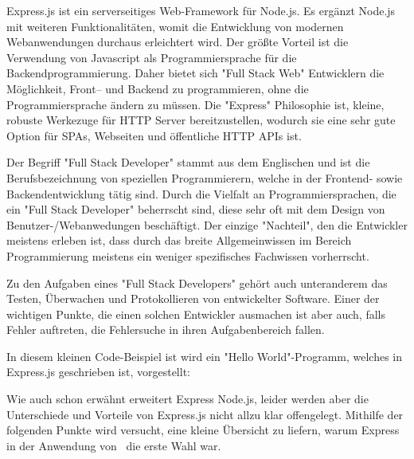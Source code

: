 
Express.js ist ein serverseitiges Web-Framework für Node.js. Es ergänzt Node.js mit weiteren Funktionalitäten, womit die Entwicklung von modernen Webanwendungen durchaus erleichtert wird. Der größte Vorteil ist die Verwendung von Javascript als Programmiersprache für die Backendprogrammierung. Daher bietet sich "Full Stack Web" Entwicklern die Möglichkeit, Front– und Backend zu programmieren, ohne die Programmiersprache ändern zu müssen. Die "Express" Philosophie ist, kleine, robuste Werkezuge für HTTP Server bereitzustellen, wodurch sie eine sehr gute Option für SPAs, Webseiten und öffentliche HTTP APIs ist. \cite{Express}

Der Begriff "Full Stack Developer" stammt aus dem Englischen und ist die Berufsbezeichnung von speziellen Programmierern, welche in der Frontend- sowie Backendentwicklung tätig sind. Durch die Vielfalt an Programmiersprachen, die ein "Full Stack Developer" beherrscht sind, diese sehr oft mit dem Design von Benutzer-/Webanwedungen beschäftigt. Der einzige "Nachteil", den die Entwickler meistens erleben ist, dass durch das breite Allgemeinwissen im Bereich Programmierung meistens ein weniger spezifisches Fachwissen vorherrscht. 

Zu den Aufgaben eines "Full Stack Developers" gehört auch unteranderem das Testen, Überwachen und Protokollieren von entwickelter Software. Einer der wichtigen Punkte, die einen solchen Entwickler ausmachen ist aber auch, falls Fehler auftreten, die Fehlersuche in ihren Aufgabenbereich fallen. \cite{FullStack}

\pagebreak
{}

In diesem kleinen Code-Beispiel ist wird ein "Hello World"-Programm, welches in Express.js geschrieben ist, vorgestellt:


\cite{Express}


Wie auch schon erwähnt erweitert Express Node.js, leider werden aber die Unterschiede und Vorteile von Express.js nicht allzu klar offengelegt. Mithilfe der folgenden Punkte wird versucht, eine kleine Übersicht zu liefern, warum Express in der Anwendung von \ZELIA\ die erste Wahl war.

